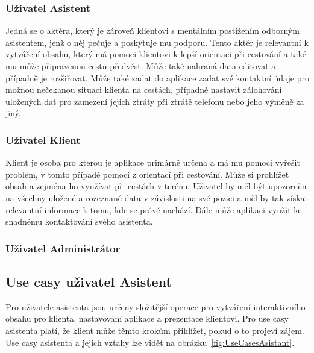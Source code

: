 \documentclass{article}
\begin{document}
\subsubsection{Uživatel Asistent}
Jedná se o aktéra, který je zároveň klientovi s mentálním postižením odborným asistentem,
jenž o něj pečuje a poskytuje mu podporu. Tento aktér je relevantní k vytváření obsahu,
který má pomoci klientovi k lepší orientaci při cestování a také mu může připravenou
cestu předvést. Může také nahraná data editovat a případně je rozšiřovat. Může také zadat
do aplikace zadat své kontaktní údaje pro možnou nečekanou situaci klienta na cestách, případně
nastavit zálohování uložených dat pro zamezení jejich ztráty při ztrátě telefonu nebo jeho výměně
za jiný.

\subsubsection{Uživatel Klient}
Klient je osoba pro kterou je aplikace primárně určena a má mu pomoci vyřešit problém,
v tomto případě pomoci z orientací při cestování. Může si prohlížet obsah a zejména ho
využívat při cestách v terénu. Uživatel by měl být upozorněn na všechny uložené a rozeznané
data v závislosti na své pozici a měl by tak získat relevantní informace k tomu, kde se právě
nachází. Dále může aplikaci využít ke snadnému kontaktování svého asistenta.



\subsubsection{Uživatel Administrátor}


\subsection{Use casy uživatel Asistent}
Pro uživatele asistenta jsou určeny složitější operace pro vytváření interaktivního obsahu pro klienta,
nastavování aplikace a prezentace klientovi. Pro use casy asistenta platí, že klient může těmto
krokům přihlížet, pokud o to projeví zájem. Use casy asistenta a jejich vztahy lze vidět na obrázku~\ref{fig:UseCasesAsistant}.
\end{document}
